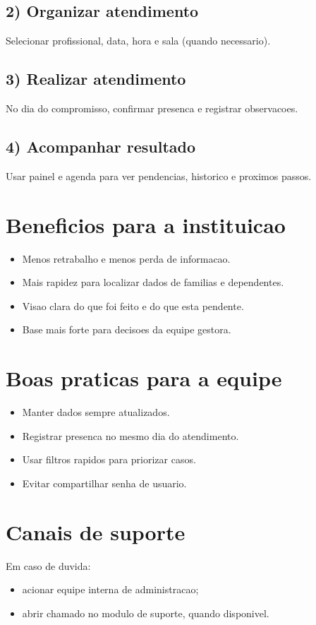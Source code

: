 \documentclass[12pt,a4paper]{article}
\begin{document}
\subsection{2) Organizar atendimento}
Selecionar profissional, data, hora e sala (quando necessario).

\subsection{3) Realizar atendimento}
No dia do compromisso, confirmar presenca e registrar observacoes.

\subsection{4) Acompanhar resultado}
Usar painel e agenda para ver pendencias, historico e proximos passos.

\section{Beneficios para a instituicao}
\begin{itemize}[leftmargin=*]
\item Menos retrabalho e menos perda de informacao.
\item Mais rapidez para localizar dados de familias e dependentes.
\item Visao clara do que foi feito e do que esta pendente.
\item Base mais forte para decisoes da equipe gestora.
\end{itemize}

\section{Boas praticas para a equipe}
\begin{itemize}[leftmargin=*]
\item Manter dados sempre atualizados.
\item Registrar presenca no mesmo dia do atendimento.
\item Usar filtros rapidos para priorizar casos.
\item Evitar compartilhar senha de usuario.
\end{itemize}

\section{Canais de suporte}
Em caso de duvida:
\begin{itemize}[leftmargin=*]
\item acionar equipe interna de administracao;
\item abrir chamado no modulo de suporte, quando disponivel.
\end{itemize}
\end{document}
